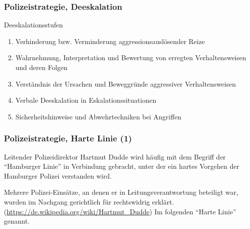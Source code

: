 \documentclass[]{beamer}
\begin{document}
	\begin{frame}
	\frametitle{Polizeistrategie, Deeskalation}
	Deeskalationsstufen
	\begin{enumerate}
		\item Verhinderung bzw. Verminderung aggressionsauslösender Reize
		\item Wahrnehmung, Interpretation und Bewertung von erregten Verhaltensweisen und deren Folgen
		\item Verständnis der Ursachen und Beweggründe aggressiver Verhaltensweisen
		\item Verbale Deeskalation in Eskalationssituationen
		\item Sicherheitshinweise und Abwehrtechniken bei Angriffen
	\end{enumerate}
	\end{frame}

	\begin{frame}
	\frametitle{Polizeistrategie, Harte Linie (1)}
	Leitender Polizeidirektor Hartmut Dudde wird häufig mit dem Begriff der \enquote{Hamburger Linie} in Verbindung gebracht, unter der ein hartes Vorgehen der Hamburger Polizei verstanden wird.\par 
	Mehrere Polizei-Einsätze, an denen er in Leitungsverantwortung beteiligt war, wurden im Nachgang gerichtlich für rechtswidrig erklärt. (\url{https://de.wikipedia.org/wiki/Hartmut_Dudde})
	\vfill
	Im folgenden \enquote{Harte Linie} genannt.
	
\end{frame}
\end{document}
